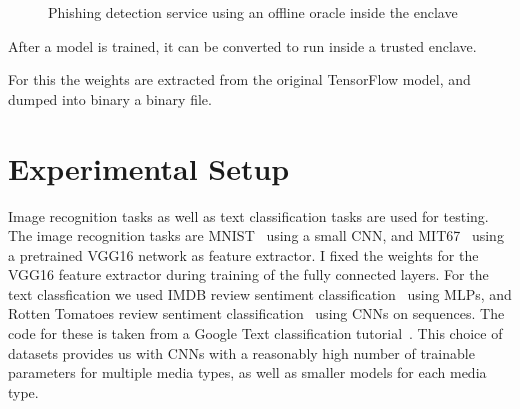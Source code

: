 \documentclass[11pt,twocolumn]{article}
\newcommand{\mail}{E-mail}
\newcommand{\tf}{TensorFlow}
\begin{document}
\begin{figure}[h]
    \centering
    \caption{Phishing detection service using an offline oracle inside the enclave}
    \label{fig:offline-phishing}
\end{figure}

After a model is trained, it can be converted to run inside a trusted enclave.

For this the weights are extracted from the original \tf{} model, and dumped into binary a binary file.

\begin{figure}[h]

\end{figure}

\section{Experimental Setup}
\label{sec:setup}

Image recognition tasks as well as text classification tasks are used for testing.
The image recognition tasks are MNIST~\cite{noauthor_mnist_nodate} using a small CNN, and MIT67~\cite{quattoni_recognizing_nodate} using a pretrained VGG16 network as feature extractor.
I fixed the weights for the VGG16 feature extractor during training of the fully connected layers.
For the text classfication we used IMDB review sentiment classification~\cite{maas_learning_2011} using MLPs, and Rotten Tomatoes review sentiment classification~\cite{noauthor_sentiment_nodate} using CNNs on sequences.
The code for these is taken from a Google Text classification tutorial~\cite{noauthor_googleeng-edu_nodate}.
This choice of datasets provides us with CNNs with a reasonably high number of trainable parameters for multiple media types, as well as smaller models for each media type.
\end{document}
